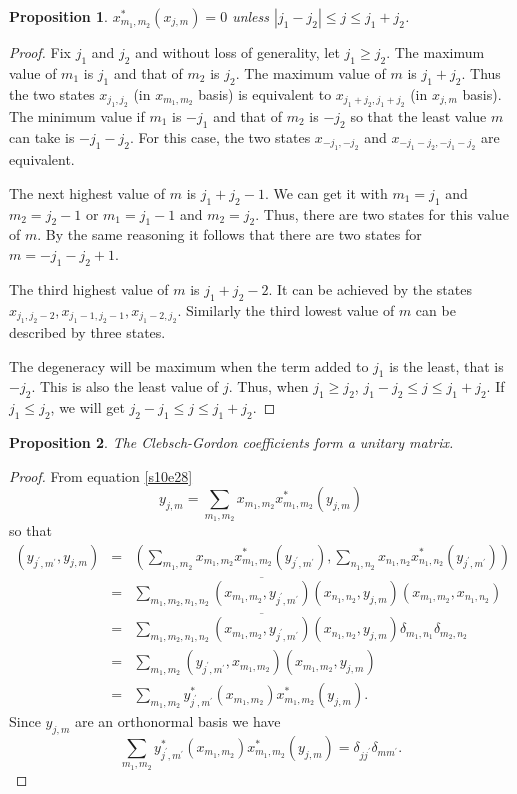 \documentclass{article}
\numberwithin{equation}{section}
\theoremstyle{plain}
\numberwithin{thm}{section}
\theoremstyle{plain}
\newtheorem{prop}{Proposition}
\numberwithin{prop}{section}
\theoremstyle{definition}
\numberwithin{defn}{section}
\theoremstyle{remark}
\begin{document}
\begin{prop}\label{s10p6}
$x_{m_1,m_2}^\ast(x_{j,m}) = 0$ unless $|j_1 - j_2| \le j \le j_1 + j_2$.
\end{prop}
\begin{proof}
Fix $j_1$ and $j_2$ and without loss of generality, let $j_1 \ge j_2$. The
maximum value of $m_1$ is $j_1$ and that of $m_2$ is $j_2$. The maximum value
of $m$ is $j_1 + j_2$. Thus the two states $x_{j_1, j_2}$ (in $x_{m_1,m_2}$
basis) is equivalent to $x_{j_1+j_2, j_1+j_2}$ (in $x_{j,m}$ basis). The minimum
value if $m_1$ is $-j_1$ and that of $m_2$ is $-j_2$ so that the least value
$m$ can take is $-j_1-j_2$. For this case, the two states $x_{-j_1,-j_2}$
and $x_{-j_1-j_2,-j_1-j_2}$ are equivalent.

The next highest value of $m$ is $j_1+j_2-1$. We can get it with $m_1 = j_1$ 
and $m_2 = j_2 - 1$ or $m_1 = j_1 - 1$ and $m_2 = j_2$. Thus, there are two 
states for this value of $m$. By the same reasoning it follows that there are
two states for $m = -j_1 - j_2 + 1$.

The third highest value of $m$ is $j_1 + j_2 - 2$. It can be achieved by
the states $x_{j_1, j_2 - 2}, x_{j_1 - 1, j_2 - 1}, x_{j_1 - 2, j_2}$. Similarly
the third lowest value of $m$ can be described by three states.

The degeneracy will be maximum when the term added to $j_1$ is the least, that
is $-j_2$. This is also the least value of $j$. Thus, when $j_1 \ge j_2$, $
j_1 - j_2 \le j \le j_1 + j_2$. If $j_1 \le j_2$, we will get $j_2 - j_1 \le
j \le j_1 + j_2$.
\end{proof}

\begin{prop}\label{s10p7}
The Clebsch-Gordon coefficients form a unitary matrix.
\end{prop}
\begin{proof}
From equation \eqref{s10e28}
\[
y_{j,m} = \sum_{m_1,m_2} x_{m_1,m_2}x^\ast_{m_1,m_2}(y_{j,m})
\]
so that
\begin{eqnarray*}
(y_{j^\prime,m^\prime}, y_{j,m}) &=& 
 \left(\sum_{m_1,m_2}x_{m_1,m_2}x_{m_1,m_2}^\ast(y_{j^\prime,m^\prime}),
 \sum_{n_1,n_2}x_{n_1,n_2}x_{n_1,n_2}^\ast(y_{j^\prime,m^\prime})\right) \\
 &=& \sum_{m_1,m_2,n_1,n_2}\overline{(x_{m_1,m_2}, y_{j^\prime,m^\prime})}
 (x_{n_1,n_2}, y_{j,m}) (x_{m_1,m_2}, x_{n_1,n_2}) \\
 &=& \sum_{m_1,m_2,n_1,n_2}\overline{(x_{m_1,m_2}, y_{j^\prime,m^\prime})}
 (x_{n_1,n_2}, y_{j,m}) \delta_{m_1,n_1}\delta_{m_2,n_2} \\
 &=& \sum_{m_1,m_2}(y_{j^\prime,m^\prime}, x_{m_1,m_2})(x_{m_1,m_2}, y_{j,m}) \\
 &=& \sum_{m_1,m_2} y_{j^\prime,m^\prime}^\ast(x_{m_1,m_2}) x^\ast_{m_1,m_2}
 (y_{j,m}).
\end{eqnarray*}
Since $y_{j,m}$ are an orthonormal basis we have
\[
\sum_{m_1,m_2} y_{j^\prime,m^\prime}^\ast(x_{m_1,m_2}) x^\ast_{m_1,m_2}(y_{j,m})
= \delta_{jj^\prime}\delta_{mm^\prime}.
\]

\end{proof}



\end{document}
